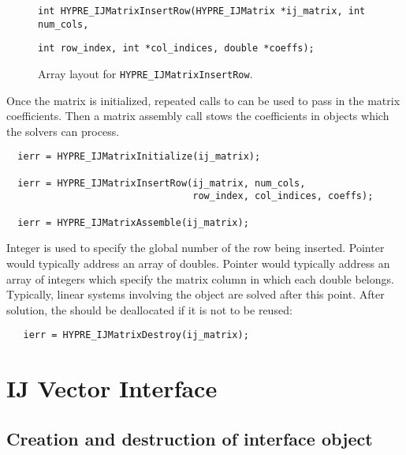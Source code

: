 \begin{figure}
\label{insert_row}
\centerline{}
\vspace{0.15in}
\parbox{6.5in}{\hspace{0.5in}
  {\tt int HYPRE\_IJMatrixInsertRow(HYPRE\_IJMatrix *ij\_matrix,
   int num\_cols, }}
\parbox{6.5in}{\hspace{1.5in}
  {\tt int row\_index, int *col\_indices, double *coeffs);}}
\vspace{0.in}
\caption{Array layout for {\tt HYPRE\_IJMatrixInsertRow}.}
\end{figure}

Once the matrix is initialized, repeated calls to
 can be used to pass in
the matrix coefficients.  Then a matrix assembly call stows
the coefficients in objects which the solvers can process. 

\begin{verbatim}
  ierr = HYPRE_IJMatrixInitialize(ij_matrix);

  ierr = HYPRE_IJMatrixInsertRow(ij_matrix, num_cols,
                                 row_index, col_indices, coeffs);

  ierr = HYPRE_IJMatrixAssemble(ij_matrix);
\end{verbatim}

\noindent Integer  is used to specify the global
number of the row being inserted.
\noindent Pointer  would typically address an array of
 doubles.
Pointer  would typically
address an array of  integers which specify the
matrix column in which each  double belongs.  
Typically, linear systems involving the 
object are solved after this point.  After solution, the
 should be deallocated if it is not to be reused:

\begin{verbatim}
   ierr = HYPRE_IJMatrixDestroy(ij_matrix);
\end{verbatim}

\section{IJ Vector Interface}

\subsection{Creation and destruction of interface object}

